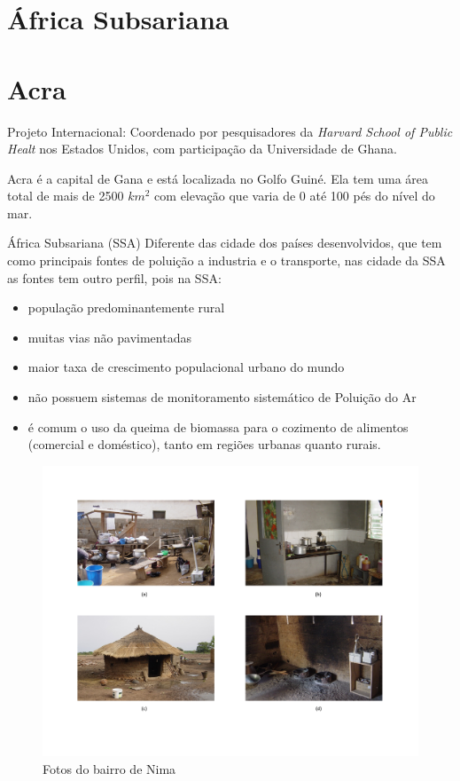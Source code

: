 \section{África Subsariana}

\section{Acra}

Projeto Internacional: Coordenado por pesquisadores da \textit{Harvard School of Public Healt} nos Estados Unidos, 
com participação da Universidade de Ghana.

Acra é a capital  de Gana e está localizada no Golfo Guiné. Ela tem uma área 
total de mais de 2500 $km^2$ com elevação que varia de 0 até 100 pés do nível 
do mar. 

África Subsariana (SSA)
  Diferente das cidade dos países desenvolvidos, que tem como principais fontes de poluição
  a industria e o transporte, nas cidade da SSA as fontes tem outro perfil, pois na SSA:
  \begin{itemize}
    \item população predominantemente rural
    \item muitas vias não pavimentadas
    \item maior taxa de crescimento populacional urbano do mundo
    \item não possuem sistemas de monitoramento sistemático de Poluição do Ar
    \item é comum o uso da queima de biomassa para o cozimento de alimentos (comercial e doméstico), tanto em regiões urbanas quanto rurais.
  \end{itemize}

  \begin{figure}[H]
    \centering
    \caption{Fotos do bairro de Nima}
    \includegraphics[scale=0.35]{../inputs/images/zheng/nima.pdf}
  \end{figure}


